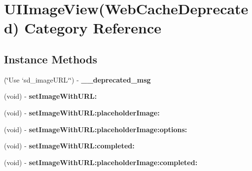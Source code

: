 \hypertarget{category_u_i_image_view_07_web_cache_deprecated_08}{}\section{U\+I\+Image\+View(Web\+Cache\+Deprecated) Category Reference}
\label{category_u_i_image_view_07_web_cache_deprecated_08}
\subsection*{Instance Methods}
\begin{DoxyCompactItemize}
\item 
\hypertarget{category_u_i_image_view_07_web_cache_deprecated_08_abce1b9f769f99947aa3b2829fb1a977a}{}(\char`\"{}Use `sd\+\_\+image\+U\+R\+L`\char`\"{}) -\/ {\bfseries \+\_\+\+\_\+deprecated\+\_\+msg}\label{category_u_i_image_view_07_web_cache_deprecated_08_abce1b9f769f99947aa3b2829fb1a977a}

\item 
\hypertarget{category_u_i_image_view_07_web_cache_deprecated_08_a64926ee9d6b72e33183a992f59fb95c7}{}(void) -\/ {\bfseries set\+Image\+With\+U\+R\+L\+:}\label{category_u_i_image_view_07_web_cache_deprecated_08_a64926ee9d6b72e33183a992f59fb95c7}

\item 
\hypertarget{category_u_i_image_view_07_web_cache_deprecated_08_a7f041a2e54f00d9afff8656c0453dcfc}{}(void) -\/ {\bfseries set\+Image\+With\+U\+R\+L\+:placeholder\+Image\+:}\label{category_u_i_image_view_07_web_cache_deprecated_08_a7f041a2e54f00d9afff8656c0453dcfc}

\item 
\hypertarget{category_u_i_image_view_07_web_cache_deprecated_08_a64debbbdbb37b8f813bcaa5f59f8a814}{}(void) -\/ {\bfseries set\+Image\+With\+U\+R\+L\+:placeholder\+Image\+:options\+:}\label{category_u_i_image_view_07_web_cache_deprecated_08_a64debbbdbb37b8f813bcaa5f59f8a814}

\item 
\hypertarget{category_u_i_image_view_07_web_cache_deprecated_08_aab6f07b6c9c39cbe710bc6616ac43955}{}(void) -\/ {\bfseries set\+Image\+With\+U\+R\+L\+:completed\+:}\label{category_u_i_image_view_07_web_cache_deprecated_08_aab6f07b6c9c39cbe710bc6616ac43955}

\item 
\hypertarget{category_u_i_image_view_07_web_cache_deprecated_08_accddd20f3c4598345f5919f47ee32fd7}{}(void) -\/ {\bfseries set\+Image\+With\+U\+R\+L\+:placeholder\+Image\+:completed\+:}\label{category_u_i_image_view_07_web_cache_deprecated_08_accddd20f3c4598345f5919f47ee32fd7}


\end{DoxyCompactItemize}
